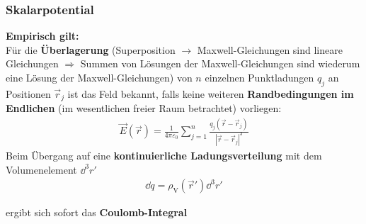 	  \subsubsection{Skalarpotential}
	  \textbf{Empirisch gilt:}\\ 
			   Für die \textbf{Überlagerung} (Superposition $\rightarrow$ Maxwell-Gleichungen sind lineare Gleichungen $\Rightarrow$ Summen von Lösungen der Maxwell-Gleichungen sind wiederum eine Lösung der Maxwell-Gleichungen) von $n$
			        einzelnen Punktladungen $q_j$ an Positionen $\vec{r} _j$ ist
			        das Feld bekannt, falls keine weiteren
			        \textbf{Randbedingungen im Endlichen} (im wesentlichen freier Raum betrachtet) vorliegen:
			        \begin{equation}\begin{split} 
					        \vec{E} (\vec{r} )= \frac{1}{4\pi\varepsilon_0} \sum_{j=1}^n \frac{q_j\left(\vec{r} -\vec{r} _j\right)}{\left|\vec{r} -\vec{r} _j\right|^3}
				        \end{split}\end{equation}
			   Beim Übergang auf eine \textbf{kontinuierliche
				        Ladungsverteilung} mit dem Volumenelement $\dd^3r'$
			        \begin{equation}\begin{split}
					        \dd q =
					        \rho_\text{V}(\vec{r}' )\dd^3r'\end{split}\end{equation}

			        ergibt sich sofort das \textbf{Coulomb-Integral}

